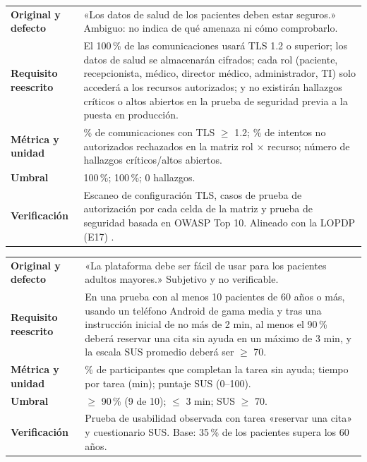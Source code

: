 \documentclass[11pt,a4paper]{article}
\begin{document}
\begin{tabularx}{\textwidth}{@{}>{\bfseries}p{3.15cm}Y@{}}
\toprule
Original y defecto & «Los datos de salud de los pacientes deben estar seguros.» Ambiguo: no indica de qué amenaza ni cómo comprobarlo.\\
Requisito reescrito & El 100\,\% de las comunicaciones usará TLS 1.2 o superior; los datos de salud se almacenarán cifrados; cada rol (paciente, recepcionista, médico, director médico, administrador, TI) solo accederá a los recursos autorizados; y no existirán hallazgos críticos o altos abiertos en la prueba de seguridad previa a la puesta en producción.\\
Métrica y unidad & \% de comunicaciones con TLS $\geq$ 1.2; \% de intentos no autorizados rechazados en la matriz rol $\times$ recurso; número de hallazgos críticos/altos abiertos.\\
Umbral & 100\,\%; 100\,\%; 0 hallazgos.\\
Verificación & Escaneo de configuración TLS, casos de prueba de autorización por cada celda de la matriz y prueba de seguridad basada en OWASP Top 10. Alineado con la LOPDP (E17) \cite{lopdp}.\\
\bottomrule
\end{tabularx}

\begin{tabularx}{\textwidth}{@{}>{\bfseries}p{3.15cm}Y@{}}
\toprule
Original y defecto & «La plataforma debe ser fácil de usar para los pacientes adultos mayores.» Subjetivo y no verificable.\\
Requisito reescrito & En una prueba con al menos 10 pacientes de 60 años o más, usando un teléfono Android de gama media y tras una instrucción inicial de no más de 2 min, al menos el 90\,\% deberá reservar una cita sin ayuda en un máximo de 3 min, y la escala SUS promedio deberá ser $\geq$ 70.\\
Métrica y unidad & \% de participantes que completan la tarea sin ayuda; tiempo por tarea (min); puntaje SUS (0--100).\\
Umbral & $\geq$ 90\,\% (9 de 10); $\leq$ 3 min; SUS $\geq$ 70.\\
Verificación & Prueba de usabilidad observada con tarea «reservar una cita» y cuestionario SUS. Base: 35\,\% de los pacientes supera los 60 años.\\
\bottomrule
\end{tabularx}
\end{document}
